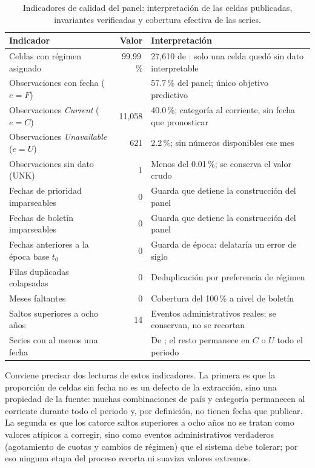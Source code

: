 \documentclass[12pt,letterpaper]{report}
\begin{document}
\begin{table}[H]
\centering
\footnotesize
\caption[Calidad del conjunto obtenido]{Indicadores de calidad del panel: interpretación de
las celdas publicadas, invariantes verificadas y cobertura efectiva de las series.}
\label{tab:calidad_obtencion}
\begin{tabular}{p{6.3cm}r p{6.0cm}}
\toprule
\rowcolor{uacjblue!15}
\textbf{Indicador} & \textbf{Valor} & \textbf{Interpretación} \\ \midrule
Celdas con régimen asignado & 99.99\,\% & 27{,}610 de \factNObsFmt{}: solo una celda quedó sin dato interpretable \\
Observaciones con fecha ($e=F$) & \factNObsFFmt{} & 57.7\,\% del panel; único objetivo predictivo \\
Observaciones \textit{Current} ($e=C$) & 11{,}058 & 40.0\,\%; categoría al corriente, sin fecha que pronosticar \\
Observaciones \textit{Unavailable} ($e=U$) & 621 & 2.2\,\%; sin números disponibles ese mes \\
Observaciones sin dato (UNK) & 1 & Menos del 0.01\,\%; se conserva el valor crudo \\
Fechas de prioridad imparseables & 0 & Guarda que detiene la construcción del panel \\
Fechas de boletín imparseables & 0 & Guarda que detiene la construcción del panel \\
Fechas anteriores a la época base $t_0$ & 0 & Guarda de época: delataría un error de siglo \\
Filas duplicadas colapsadas & 0 & Deduplicación por preferencia de régimen \\
Meses faltantes & 0 & Cobertura del 100\,\% a nivel de boletín \\
Saltos superiores a ocho años & 14 & Eventos administrativos reales; se conservan, no se recortan \\
Series con al menos una fecha & \factNSeriesWithF{} & De \factNSeriesStructural{}; el resto permanece en $C$ o $U$ todo el periodo \\
\bottomrule
\end{tabular}
\end{table}

Conviene precisar dos lecturas de estos indicadores. La primera es que la proporción de
celdas sin fecha no es un defecto de la extracción, sino una propiedad de la fuente: muchas
combinaciones de país y categoría permanecen al corriente durante todo el periodo y, por
definición, no tienen fecha que publicar. La segunda es que los catorce saltos superiores a
ocho años no se tratan como valores atípicos a corregir, sino como eventos administrativos
verdaderos (agotamiento de cuotas y cambios de régimen) que el sistema debe tolerar; por eso
ninguna etapa del proceso recorta ni suaviza valores extremos.
\end{document}
